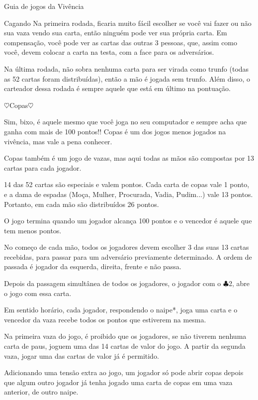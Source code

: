 \begin{secao}{Guia de jogos da Vivência }
\begin{subsecao}{Cagando}
Na primeira rodada, ficaria muito fácil escolher se você vai fazer ou não sua vaza vendo sua carta, então ninguém pode ver sua própria carta. Em compensação, você pode ver as cartas das outras 3 pessoas, que, assim como você, devem colocar a carta na testa, com a face para os adversários. 

Na última rodada, não sobra nenhuma carta para ser virada como trunfo (todas as 52 cartas foram distribuídas), então a mão é jogada sem trunfo. Além disso, o carteador dessa rodada é sempre aquele que está em último na pontuação.


\end{subsecao}

\begin{subsecao}{$\heartsuit$Copas$\heartsuit$} 

Sim, bixo, é aquele mesmo que você joga no seu computador e sempre acha que ganha com mais de 100 pontos!! Copas é um dos jogos menos jogados na vivência, mas vale a pena conhecer. 

Copas também é um jogo de vazas, mas aqui todas as mãos são compostas por 13 cartas para cada jogador. 

14 das 52 cartas são especiais e valem pontos. Cada carta de copas vale 1 ponto, e a dama de espadas (Moça, Mulher, Procurada, Vadia, Pudim...) vale 13 pontos. Portanto, em cada mão são distribuídos 26 pontos. 

O jogo termina quando um jogador alcança 100 pontos e o vencedor é aquele que tem menos pontos. 

No começo de cada mão, todos os jogadores devem escolher 3 das suas 13 cartas recebidas, para passar para um adversário previamente determinado. A ordem de passada é jogador da esquerda, direita, frente e não passa.

Depois da passagem simultânea de todos os jogadores, o jogador com o $\clubsuit$2, abre o jogo com essa carta.

Em sentido horário, cada jogador, respondendo o naipe*, joga uma carta e o vencedor da vaza recebe todos os pontos que estiverem na mesma.

Na primeira vaza do jogo, é proibido que os jogadores, se não tiverem nenhuma carta de paus, joguem uma das 14 cartas de valor do jogo. A partir da segunda vaza, jogar uma das cartas de valor já é permitido.

 Adicionando uma tensão extra ao jogo, um jogador só pode abrir copas depois que algum outro jogador já tenha jogado uma carta de copas em uma vaza anterior, de outro naipe.


\end{subsecao}
\end{secao}
